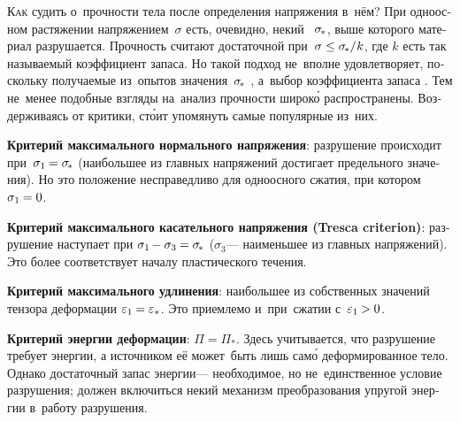 \begin{otherlanguage}{russian}

\lettrine[lines=2, findent=2pt, nindent=0pt]{К}{ак} судить о~прочности тела после определения напряжения в~нём? При одноосном растяжении напряжением~$\sigma$ есть, очевидно, некий ~${\sigma_{\hspace{-0.25ex}*}}$, выше которого материал разрушается. Прочность считают достаточной при~${\sigma \leq \sigma_{\hspace{-0.25ex}*} / \hspace{.1ex} k}$, где $k$ есть так называемый коэффициент запаса. Но такой подход не~вполне удовлетворяет, поскольку получаемые из~опытов значения~${\sigma_{\hspace{-0.25ex}*}}$ , а~выбор коэффициента запаса . Тем не~менее подобные взгляды на~анализ прочности широк\'{о} распространены. Воздерживаясь от критики, ст\'{о}ит упомянуть самые популярные из~них.

\textbf{Критерий максимального нормального напряжения}: разрушение происходит при~${\sigma_1 \hspace{-0.12ex} = \sigma_{\hspace{-0.25ex}*}}$ (наибольшее из главных напряжений достигает предельного значения). Но это положение несправедливо для одноосного сжатия, при котором ${\sigma_1 \hspace{-0.12ex} = 0}$.

\textbf{Критерий максимального касательного напряжения (Tresca criterion)}: разрушение наступает при ${\sigma_1 \hspace{-0.16ex} - \sigma_3 \hspace{-0.1ex} = \sigma_{\hspace{-0.25ex}*}}$ ($\sigma_3$\:--- наименьшее из главных напряжений). Это более соответствует началу пластического течения.

\textbf{Критерий максимального удлинения}: наибольшее из собственных значений тензора деформации ${\varepsilon_1 \hspace{-0.12ex} = \varepsilon_*}$. Это приемлемо и~при~сжатии с~${\varepsilon_1 \hspace{-0.12ex} > 0}$.

\textbf{Критерий энергии деформации}: ${\Pi = \Pi_*}$. Здесь учитывается, что разрушение требует энергии, а источником её может~быть лишь сам\'{о} деформированное тело. Однако достаточный запас энергии\:--- необходимое, но не~единственное условие разрушения; должен включиться некий механизм преобразования упругой энергии в~работу разрушения.


\end{otherlanguage}
